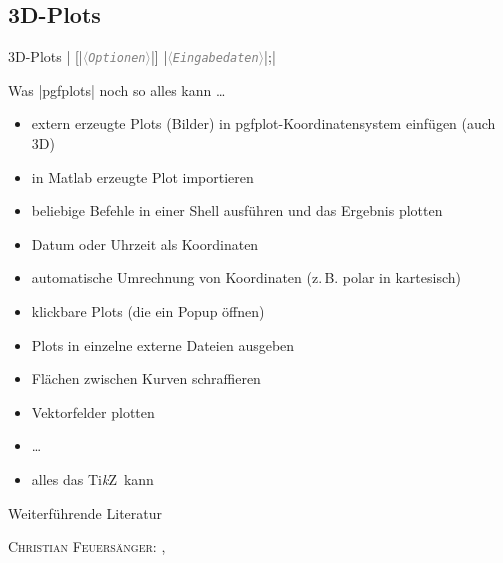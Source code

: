 \documentclass{beamer}
\newcommand{\meta}[1]{\textcolor{gray}{$\langle$\texttt{\textsl{#1}}$\rangle$}}
\newcommand{\TikZ}{Ti\textit{k}Z}
\begin{document}
\subsection{3D-Plots}
\begin{frame}[fragile,t]{3D-Plots}%
| [|\meta{Optionen}|] {|\meta{Eingabedaten}|};| \vfill
\begin{LTXexample}[pos=r, explpreset={}, preset=\small, rframe={}]
\end{LTXexample}
\end{frame}






\begin{frame}{Was |pgfplots| noch so alles kann …}
\begin{itemize}
\item extern erzeugte Plots (Bilder) in pgfplot-Koordinatensystem einfügen (auch 3D)
\item in Matlab erzeugte Plot importieren
\item beliebige Befehle in einer Shell ausführen und das Ergebnis plotten
\item Datum oder Uhrzeit als Koordinaten
\item automatische Umrechnung von Koordinaten (z.\,B. polar in kartesisch)
\item klickbare Plots (die ein Popup öffnen)
\item Plots in einzelne externe Dateien ausgeben
\item Flächen zwischen Kurven schraffieren
\item Vektorfelder plotten
\item …
\item alles das \TikZ\ kann
\end{itemize}
\end{frame}

\begin{frame}{Weiterführende Literatur}
\begin{thebibliography}{9}
 \textsc{Christian Feuersänger}:
	, 

\end{thebibliography}
\end{frame}
\end{document}
